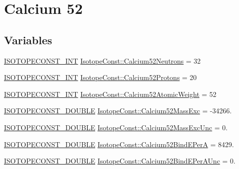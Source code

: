 \hypertarget{group___isotope_const-_calcium-_ca52}{}\section{Calcium 52}
\label{group___isotope_const-_calcium-_ca52}
\subsection*{Variables}
\begin{DoxyCompactItemize}
\item 
\mbox{\hyperlink{group___isotope_const-_macros_ga5f18360b3e99483a35c32d789e62621c}{I\+S\+O\+T\+O\+P\+E\+C\+O\+N\+S\+T\+\_\+\+I\+NT}} \mbox{\hyperlink{group___isotope_const-_calcium-_ca52_ga81fc1cfe178861a2fa810e350cb314fe}{Isotope\+Const\+::\+Calcium52\+Neutrons}} = 32
\item 
\mbox{\hyperlink{group___isotope_const-_macros_ga5f18360b3e99483a35c32d789e62621c}{I\+S\+O\+T\+O\+P\+E\+C\+O\+N\+S\+T\+\_\+\+I\+NT}} \mbox{\hyperlink{group___isotope_const-_calcium-_ca52_ga8b0b69cbf314a9fefe57135f71e13db7}{Isotope\+Const\+::\+Calcium52\+Protons}} = 20
\item 
\mbox{\hyperlink{group___isotope_const-_macros_ga5f18360b3e99483a35c32d789e62621c}{I\+S\+O\+T\+O\+P\+E\+C\+O\+N\+S\+T\+\_\+\+I\+NT}} \mbox{\hyperlink{group___isotope_const-_calcium-_ca52_ga20c2e65e41e31b8876894937d9915c74}{Isotope\+Const\+::\+Calcium52\+Atomic\+Weight}} = 52
\item 
\mbox{\hyperlink{group___isotope_const-_macros_ga8f45a7272ce02c0b4c65c44636ed719a}{I\+S\+O\+T\+O\+P\+E\+C\+O\+N\+S\+T\+\_\+\+D\+O\+U\+B\+LE}} \mbox{\hyperlink{group___isotope_const-_calcium-_ca52_gaec3da509aafbbbe0e9dc53616f8c7cc4}{Isotope\+Const\+::\+Calcium52\+Mass\+Exc}} = -\/34266.
\item 
\mbox{\hyperlink{group___isotope_const-_macros_ga8f45a7272ce02c0b4c65c44636ed719a}{I\+S\+O\+T\+O\+P\+E\+C\+O\+N\+S\+T\+\_\+\+D\+O\+U\+B\+LE}} \mbox{\hyperlink{group___isotope_const-_calcium-_ca52_gae80e1f72c807f5701854f8c3dcabdb0b}{Isotope\+Const\+::\+Calcium52\+Mass\+Exc\+Unc}} = 0.
\item 
\mbox{\hyperlink{group___isotope_const-_macros_ga8f45a7272ce02c0b4c65c44636ed719a}{I\+S\+O\+T\+O\+P\+E\+C\+O\+N\+S\+T\+\_\+\+D\+O\+U\+B\+LE}} \mbox{\hyperlink{group___isotope_const-_calcium-_ca52_ga3cadfdd6e940544b8fb59bffe547830a}{Isotope\+Const\+::\+Calcium52\+Bind\+E\+PerA}} = 8429.
\item 
\mbox{\hyperlink{group___isotope_const-_macros_ga8f45a7272ce02c0b4c65c44636ed719a}{I\+S\+O\+T\+O\+P\+E\+C\+O\+N\+S\+T\+\_\+\+D\+O\+U\+B\+LE}} \mbox{\hyperlink{group___isotope_const-_calcium-_ca52_ga85f8a4aa5c3ddd588b37051ce3956d1b}{Isotope\+Const\+::\+Calcium52\+Bind\+E\+Per\+A\+Unc}} = 0.

\end{DoxyCompactItemize}

